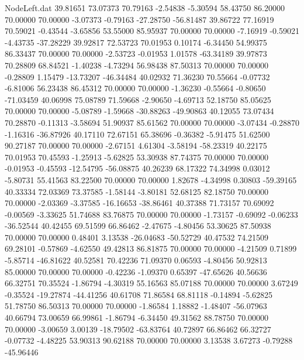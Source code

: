 \begin{filecontents}{NodeLeft.dat}
  39.81651   73.07373   70.79163    -2.54838   -5.30594   58.43750   86.20000   70.00000   70.00000   -3.07373   -0.79163  -27.28750  -56.81487
  39.86722   77.16919   70.59021    -0.43544   -3.65856   53.55000   85.95937   70.00000   70.00000   -7.16919   -0.59021   -4.43735  -37.28229
  39.92817   72.53723   70.01953     0.10174   -6.34450   54.99375   86.33437   70.00000   70.00000   -2.53723   -0.01953    1.01578  -63.34189
  39.97873   70.28809   68.84521    -1.40238   -4.73294   56.98438   87.50313   70.00000   70.00000   -0.28809    1.15479  -13.73207  -46.34484
  40.02932   71.36230   70.55664    -0.07732   -6.81006   56.23438   86.45312   70.00000   70.00000   -1.36230   -0.55664   -0.80650  -71.03459
  40.06998   75.08789   71.59668    -2.90650   -4.69713   52.18750   85.05625   70.00000   70.00000   -5.08789   -1.59668  -30.88263  -49.90863
  40.12055   73.07434   70.28870    -0.11313   -3.58694   51.90937   85.61562   70.00000   70.00000   -3.07434   -0.28870   -1.16316  -36.87926
  40.17110   72.67151   65.38696    -0.36382   -5.91475   51.62500   90.27187   70.00000   70.00000   -2.67151    4.61304   -3.58194  -58.23319
  40.22175   70.01953   70.45593    -1.25913   -5.62825   53.30938   87.74375   70.00000   70.00000   -0.01953   -0.45593  -12.54795  -56.08875
  40.26239   68.17322   74.34998     0.03012   -5.80731   55.41563   83.22500   70.00000   70.00000    1.82678   -4.34998    0.30803  -59.39165
  40.33334   72.03369   73.37585    -1.58144   -3.80181   52.68125   82.18750   70.00000   70.00000   -2.03369   -3.37585  -16.16653  -38.86461
  40.37388   71.73157   70.69092    -0.00569   -3.33625   51.74688   83.76875   70.00000   70.00000   -1.73157   -0.69092   -0.06233  -36.52544
  40.42455   69.51599   66.86462    -2.47675   -4.80456   53.30625   87.50938   70.00000   70.00000    0.48401    3.13538  -26.04683  -50.52729
  40.47532   74.21509   69.28101    -0.57869   -4.62550   49.42813   86.81875   70.00000   70.00000   -4.21509    0.71899   -5.85714  -46.81622
  40.52581   70.42236   71.09370     0.06593   -4.80456   50.92813   85.00000   70.00000   70.00000   -0.42236   -1.09370    0.65397  -47.65626
  40.56636   66.32751   70.35524    -1.86794   -4.30319   55.16563   85.07188   70.00000   70.00000    3.67249   -0.35524  -19.27874  -44.41256
  40.61708   71.86584   68.81118    -0.14894   -5.62825   51.78750   86.50313   70.00000   70.00000   -1.86584    1.18882   -1.48407  -56.07963
  40.66794   73.00659   66.99861    -1.86794   -6.34450   49.31562   88.78750   70.00000   70.00000   -3.00659    3.00139  -18.79502  -63.83764
  40.72897   66.86462   66.32727    -0.07732   -4.48225   53.90313   90.62188   70.00000   70.00000    3.13538    3.67273   -0.79288  -45.96446

\end{filecontents}
